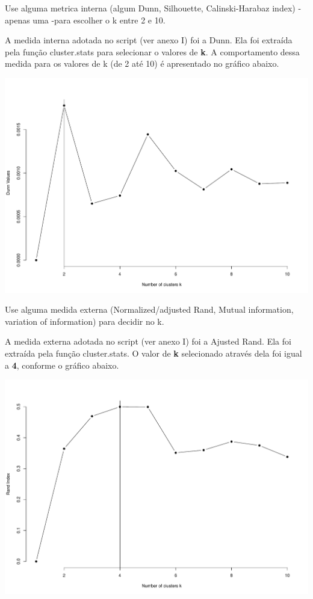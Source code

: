 \documentclass[10pt, a4paper]{exam}
\begin{document}
	\begin{questions}	    
	    \question
	    Use alguma metrica interna (algum Dunn, Silhouette, Calinski-Harabaz index) - apenas uma -para escolher o k entre 2 e 10. 
		\begin{solution}
			A medida interna adotada no script (ver anexo I) foi a Dunn. Ela foi extraída pela função cluster.stats para selecionar o valores de \textbf{k}. A comportamento dessa medida para os valores de k (de 2 até 10) é apresentado no gráfico abaixo.
			
			
		\begin{center}
  				\includegraphics[scale=.5]{g1.pdf}
			\end{center}
				
		\end{solution}
		
		
	  	\pagebreak
	  	\question 
	  	Use alguma medida externa (Normalized/adjusted Rand, Mutual information, variation of information) para decidir no k.  
	    \begin{solution}
			A medida externa adotada no script (ver anexo I) foi a Ajusted Rand. Ela foi extraída pela função cluster.stats. O valor de \textbf{k} selecionado através dela foi igual a \textbf{4}, conforme o gráfico abaixo.
			
				
		\end{solution}
			\begin{center}
  				\includegraphics[scale=.5]{g2.pdf}
				\end{center}

\end{questions}
\end{document}

